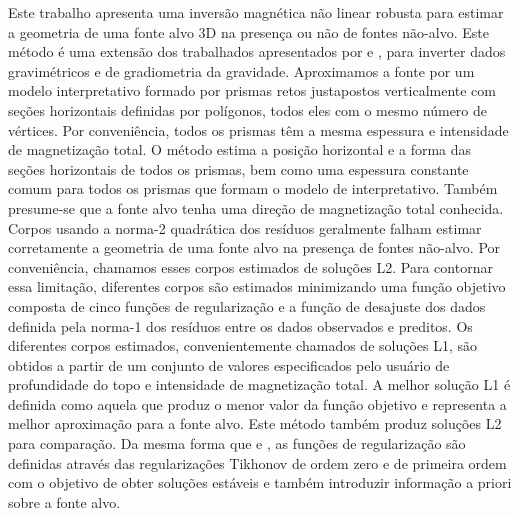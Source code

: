Este trabalho apresenta uma inversão magnética não linear robusta para estimar a geometria de uma fonte alvo 3D na presença ou não de fontes não-alvo.
Este método é uma extensão dos trabalhados apresentados por \citet{oliveirajr_etal2011} e 
\citet{oliveirajr_barbosa2013}, para inverter dados gravimétricos e de gradiometria da gravidade.
Aproximamos a fonte por um modelo interpretativo formado por prismas retos justapostos verticalmente com seções horizontais definidas por polígonos, todos eles com o mesmo número de vértices.
Por conveniência, todos os prismas têm a mesma espessura e intensidade de magnetização total.
O método estima a posição horizontal e a forma das seções horizontais de todos os prismas, bem como uma espessura constante comum para todos os prismas que formam o modelo de interpretativo.
Também presume-se que a fonte alvo tenha uma direção de magnetização total conhecida.
Corpos usando a norma-2 quadrática dos resíduos geralmente falham estimar corretamente a geometria de uma fonte alvo na presença de fontes não-alvo.
Por conveniência, chamamos esses corpos estimados de soluções L2.
Para contornar essa limitação, diferentes corpos são estimados minimizando uma função objetivo composta de cinco funções de regularização e a função de desajuste dos dados definida pela norma-1 dos resíduos entre os dados observados e preditos.
Os diferentes corpos estimados, convenientemente chamados de soluções L1, são obtidos a partir de um conjunto de valores especificados pelo usuário de profundidade do topo e intensidade de magnetização total.
A melhor solução L1 é definida como aquela que produz o menor valor da função objetivo e representa a melhor aproximação para a fonte alvo.
Este método também produz soluções L2 para comparação.
Da mesma forma que \citet{oliveirajr_etal2011} e \citet{oliveirajr_barbosa2013}, as funções de regularização são definidas através das regularizações Tikhonov de ordem zero e de primeira ordem \citep[por exemplo,][p. 96 e 104]{aster_etal2019} com o objetivo de obter soluções estáveis e também introduzir informação a priori sobre a fonte alvo.

